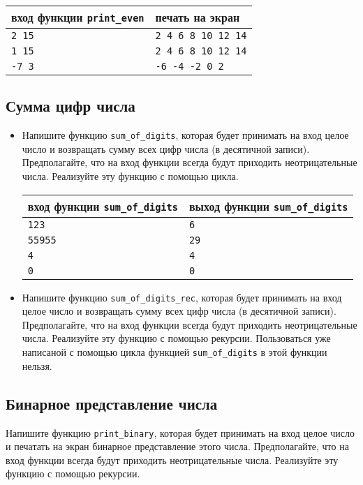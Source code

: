 \documentclass[10pt]{article}
\begin{document}
\begin{center}
\begin{tabular}{ l | l }
 вход функции \texttt{print\_even} & печать на экран \\ \hline
 \texttt{2 15} & \texttt{2 4 6 8 10 12 14}  \\
 \texttt{1 15} & \texttt{2 4 6 8 10 12 14}  \\  
 \texttt{-7 3} & \texttt{-6 -4 -2 0 2}  \\
\end{tabular}
\end{center}

\newpage


\subsection{Сумма цифр числа}
\begin{itemize}
\item Напишите функцию \texttt{sum\_of\_digits}, которая будет принимать на вход целое число и возвращать сумму всех цифр числа (в десятичной записи). Предполагайте, что на вход функции всегда будут приходить неотрицательные числа. Реализуйте эту функцию с помощью цикла.

\begin{center}
\begin{tabular}{ l | l }
 вход функции \texttt{sum\_of\_digits} & выход функции \texttt{sum\_of\_digits} \\ \hline
 \texttt{123} & \texttt{6}  \\
 \texttt{55955} & \texttt{29}  \\  
 \texttt{4} & \texttt{4}  \\
 \texttt{0} & \texttt{0}  \\
\end{tabular}
\end{center}

\item Напишите функцию \texttt{sum\_of\_digits\_rec}, которая будет принимать на вход целое число и возвращать сумму всех цифр числа (в десятичной записи). Предполагайте, что на вход функции всегда будут приходить неотрицательные числа. Реализуйте эту функцию с помощью рекурсии. Пользоваться уже написаной с помощью цикла функцией \texttt{sum\_of\_digits} в этой функции нельзя.
 \end{itemize}
 
 
\subsection{Бинарное представление числа}
Напишите функцию \texttt{print\_binary}, которая будет принимать на вход целое число и печатать на экран бинарное представление этого числа. Предполагайте, что на вход функции всегда будут приходить неотрицательные числа.
Реализуйте эту функцию с помощью рекурсии.
 
\end{document}
